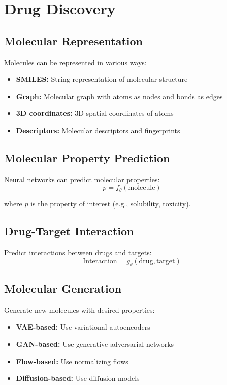 \section{Drug Discovery}

\subsection{Molecular Representation}

Molecules can be represented in various ways:
\begin{itemize}
    \item \textbf{SMILES:} String representation of molecular structure
    \item \textbf{Graph:} Molecular graph with atoms as nodes and bonds as edges
    \item \textbf{3D coordinates:} 3D spatial coordinates of atoms
    \item \textbf{Descriptors:} Molecular descriptors and fingerprints
\end{itemize}

\subsection{Molecular Property Prediction}

Neural networks can predict molecular properties:
\begin{equation}
    p = f_\theta(\text{molecule})
\end{equation}

where $p$ is the property of interest (e.g., solubility, toxicity).

\subsection{Drug-Target Interaction}

Predict interactions between drugs and targets:
\begin{equation}
    \text{Interaction} = g_\theta(\text{drug}, \text{target})
\end{equation}

\subsection{Molecular Generation}

Generate new molecules with desired properties:
\begin{itemize}
    \item \textbf{VAE-based:} Use variational autoencoders
    \item \textbf{GAN-based:} Use generative adversarial networks
    \item \textbf{Flow-based:} Use normalizing flows
    \item \textbf{Diffusion-based:} Use diffusion models
\end{itemize}

